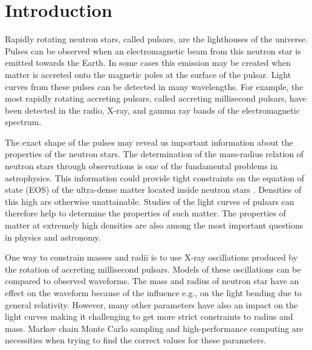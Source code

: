 \documentclass{wihuri}
\begin{document}
\newpage

\tableofcontents %

\newpage





\section*{Introduction}

Rapidly rotating neutron stars, called pulsars, are the lighthouses of the universe. Pulses can be observed when an electromagnetic beam from this neutron star is emitted towards the Earth.  In some cases this emission may be created when matter is accreted onto the magnetic poles at the surface of the pulsar. Light curves from these pulses can be detected in many wavelengths. For example, the most rapidly rotating accreting pulsars, called accreting millisecond pulsars, 
have been detected in the radio, X-ray, and gamma ray bands of the electromagnetic spectrum. %

The exact shape of the pulses may reveal us important information about the properties of the neutron stars. The determination of the mass-radius relation of neutron stars through observations is one of the fundamental problems in astrophysics. This information could provide tight constraints on the equation of state (EOS) of the ultra-dense matter located inside neutron stars \cite{lattimer2007} \cite{hebeler}. Densities of this high are otherwise unattainable.
Studies of the light curves of pulsars can therefore help to determine the properties of such matter. The properties of matter at extremely high densities are also among the most important questions in physics and astronomy. 


One way to constrain masses and radii is to use X-ray oscillations produced by the rotation of accreting millisecond pulsars. Models of these oscillations can be compared to observed waveforms.  
The mass and radius of neutron star have an effect on the waveform because of the influence e.g., on the light bending due to general relativity. However, many other parameters have also an impact on the light curves making it challenging to get more strict constraints to radius and mass. Markov chain Monte Carlo sampling and high-performance computing are necessities when trying to find the correct values for these parameters. 
\end{document}
